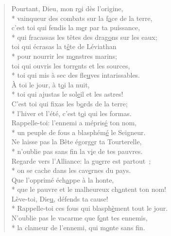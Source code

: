 \begin{verse}
Pourtant, Dieu, mon r\underline{o}i dès l’origine, \\*
vainqueur des combats sur la f\underline{a}ce de la terre, \\
c’est toi qui fendis la m\underline{e}r par ta puissance, \\*
qui fracassas les têtes des drag\underline{o}ns sur les eaux; \\

toi qui écrasas la t\underline{ê}te de Léviathan \\*
pour nourrir les m\underline{o}nstres marins; \\
toi qui ouvris les torr\underline{e}nts et les sources, \\*
toi qui mis à sec des fle\underline{u}ves intarissables. \\

À toi le jour, à t\underline{o}i la nuit, \\*
toi qui ajustas le sol\underline{e}il et les astres! \\
C’est toi qui fixas les b\underline{o}rds de la terre; \\*
l’hiver et l’été, c’est t\underline{o}i qui les formas. \\

Rappelle-toi: l’ennemi a mépris\underline{é} ton nom, \\*
un peuple de fous a blasphém\underline{é} le Seigneur. \\
Ne laisse pas la Bête égorg\underline{e}r ta Tourterelle, \\*
n’oublie pas sans fin la v\underline{i}e de tes pauvres. \\

Regarde vers l’Alliance: la gu\underline{e}rre est partout ; \\*
on se cache dans les cav\underline{e}rnes du pays. \\
Que l’opprimé éch\underline{a}ppe à la honte, \\*
que le pauvre et le malheureux ch\underline{a}ntent ton nom! \\

Lève-toi, Die\underline{u}, défends ta cause! \\*
Rappelle-toi ces fous qui blasph\underline{è}ment tout le jour. \\
N’oublie pas le vacarme que f\underline{o}nt tes ennemis, \\*
la clameur de l’ennemi, qui m\underline{o}nte sans fin. \\
\end{verse}

